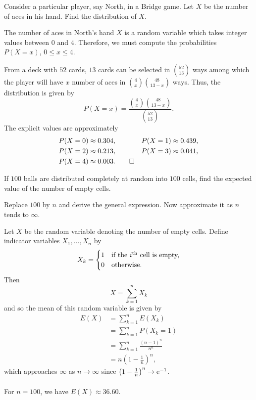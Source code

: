\begin{problem}[Handout 1, \# 16]
  Consider a particular player, say North, in a Bridge game. Let \(X\) be
  the number of aces in his hand. Find the distribution of \(X\).
\end{problem}
\begin{solution*}
  The number of aces in North's hand \(X\) is a random variable which takes
  integer values between \(0\) and \(4\). Therefore, we must compute the
  probabilities \(P(X=x)\), \(0\leq x\leq 4\).

  From a deck with \(52\) cards, \(13\) cards can be selected in
  \(\binom{52}{13}\) ways among which the player will have \(x\) number of
  aces in \(\binom{4}{x}\binom{48}{13-x}\) ways. Thus, the distribution is
  given by
  \[
    P(X=x)=\frac{\binom{4}{x}\binom{48}{13-x}}{\binom{52}{13}}.
  \]
  The explicit values are approximately
  \begin{align*}
    P(X=0)&\approx 0.304,
    &P(X=1)&\approx 0.439,\\
    P(X=2)&\approx 0.213,
    &P(X=3)&\approx 0.041,\\
    P(X=4)&\approx 0.003.\qedhere
  \end{align*}
\end{solution*}

\begin{problem}[Handout 1, \# 20]
  If \(100\) balls are distributed completely at random into \(100\) cells,
  find the expected value of the number of empty cells.

  \noindent Replace \(100\) by \(n\) and derive the general expression. Now
  approximate it as \(n\) tends to \(\infty\).
\end{problem}
\begin{solution*}
  Let \(X\) be the random variable denoting the number of empty
  cells. Define indicator variables \(X_1,\dotsc,X_n\) by
  \[
    X_k=
    \begin{cases}
      1&\text{if the \(i\)\textsuperscript{th} cell is empty,}\\
      0&\text{otherwise.}
    \end{cases}
  \]
  Then
  \[
    X=\sum_{k=1}^n X_k
  \]
  and so the mean of this random variable is given by
  \begin{align*}
    E(X)
    &=\sum_{k=1}^n E(X_k)\\
    &=\sum_{k=1}^n P(X_k=1)\\
    &=\sum_{k=1}^n\frac{(n-1)^n}{n^n}\\
    &=n\left(1-\frac{1}{n}\right)^n,
  \end{align*}
  which approaches \(\infty\) as \(n\to\infty\) since
  \(\bigl(1-\frac{1}{n}\bigr)^n\to \mathrm{e}^{-1}\).
  \\\\
  For \(n=100\), we have \(E(X)\approx 36.60\).
\end{solution*}

